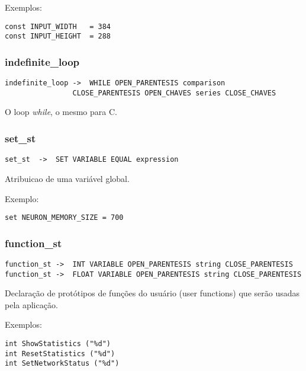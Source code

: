 \documentclass[a4paper,10pt]{article}
\begin{document}
Exemplos:
\begin{lstlisting}
const INPUT_WIDTH 	= 384
const INPUT_HEIGHT	= 288
\end{lstlisting}
\vspace{10mm}

	\subsubsection{indefinite\_loop}
		\begin{lstlisting}
indefinite_loop	->	WHILE OPEN_PARENTESIS comparison
				CLOSE_PARENTESIS OPEN_CHAVES series CLOSE_CHAVES
		\end{lstlisting}
O loop \textit{while}, o mesmo para C.

\vspace{10mm}

	\subsubsection{set\_st}
		\begin{lstlisting}
set_st	->	SET VARIABLE EQUAL expression
		\end{lstlisting}
Atribuicao de uma vari\'avel global.

Exemplo:
\begin{lstlisting}
set NEURON_MEMORY_SIZE = 700
\end{lstlisting}
\vspace{10mm}

	\subsubsection{function\_st}
		\begin{lstlisting}
function_st	->	INT VARIABLE OPEN_PARENTESIS string CLOSE_PARENTESIS 
function_st	->	FLOAT VARIABLE OPEN_PARENTESIS string CLOSE_PARENTESIS 
		\end{lstlisting}
Declara\c{c}\~{a}o de prot\'otipos de fun\c{c}\~oes do usu\'ario (user functions) que ser\~{a}o usadas pela aplica\c{c}\~ao.

Exemplos:
\begin{lstlisting}
int ShowStatistics ("%d")
int ResetStatistics ("%d")
int SetNetworkStatus ("%d")
\end{lstlisting}
\vspace{10mm}
\end{document}
